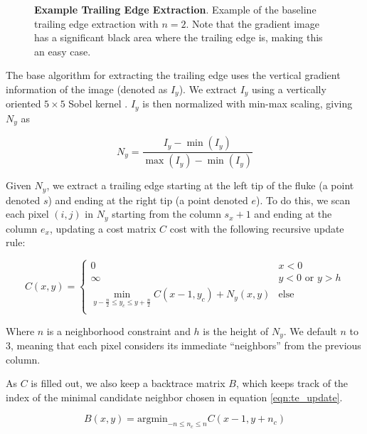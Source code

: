 \begin{figure}[t]%
\centering
{}
\newline
{}
\caption{\textbf{Example Trailing Edge Extraction}. Example of the baseline trailing edge extraction with $n = 2$. Note that the gradient image has a significant black area where the trailing edge is, making this an easy case.}
\label{fig:example_te_extract_noscorer}
\end{figure}

The base algorithm for extracting the trailing edge uses the vertical gradient information of the image (denoted as $I_y$).
We extract $I_y$ using a vertically oriented $5 \times 5$ Sobel kernel \cite{Sobel1968}.  
$I_y$ is then normalized with min-max scaling, giving $N_y$ as

\begin{equation} \label{eqn:norm01}
N_{y} = \frac{I_y - \min(I_y)}{\max(I_y) - \min(I_y)}
\end{equation}

Given $N_y$, we extract a trailing edge starting at the left tip of the fluke (a point denoted $s$) and ending at the right tip (a point denoted $e$).
To do this, we scan each pixel $(i,j)$ in $N_y$ starting from the column $s_x + 1$ and ending at the column $e_x$, updating a cost matrix $C$ cost with the following recursive update rule:

\begin{equation} \label{eqn:te_update}
C(x,y) = 
\begin{cases}
	0 & x < 0 \\
	\infty & y < 0 \text{ or } y > h \\
	\min_{y - \frac{n}{2} \leq y_c \leq y + \frac{n}{2}}C(x-1, y_c) + N_y(x,y) & \text{else} \\
\end{cases}
\end{equation}

Where $n$ is a neighborhood constraint and $h$ is the height of $N_y$.  
We default $n$ to $3$, meaning that each pixel considers its immediate ``neighbors'' from the previous column.

As $C$ is filled out, we also keep a backtrace matrix $B$, which keeps track of the index of the minimal candidate neighbor chosen in equation \eqref{eqn:te_update}.

\begin{equation} \label{eqn:backtrace_update}
	B(x,y) = \text{argmin}_{-n \leq n_c \leq n} C(x-1, y+n_c)
\end{equation}


